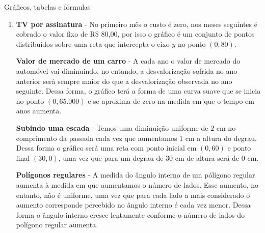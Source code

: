 \begin{answer}{Gráficos, tabelas e fórmulas}
{\begin{enumerate}


\textbf{Polígonos regulares}




\item \textbf{TV por assinatura} - No primeiro mês o custo é zero, nos meses seguintes é cobrado o valor fixo de R\$ 80,00, por isso o gráfico é um conjunto de pontos distribuídos sobre uma reta que intercepta o eixo $y$ no ponto $(0,80)$.

\textbf{Valor de mercado de um carro} - A cada ano o valor de mercado do automóvel vai diminuindo, no entando, a desvalorização sofrida no ano anterior será sempre maior do que a desvalorização observada no ano seguinte. Dessa forma, o gráfico terá a forma de uma curva suave que se inicia no ponto $(0,65.000) $ e se aproxima de zero na medida em que o tempo em anos aumenta.

\textbf{Subindo uma escada} - Temos uma diminuição uniforme de $2$ cm no comprimento da passada cada vez que aumentamos $1$ cm a altura do degrau. Dessa forma o gráfico será uma reta com ponto inicial em $(0,60)$ e ponto final $(30,0)$, uma vez que para um degrau de $30$ cm de altura será de $0$ cm.

\textbf{Polígonos regulares} - A medida do ângulo interno de um pólígono regular aumenta à medida em que aumentamos o número de lados. Esse aumento, no entanto, não é uniforme, uma vez que para cada lado a mais considerado o aumento corresponde percebido no ângulo interno é cada vez menor. Dessa forma o ângulo interno cresce lentamente conforme o número de lados do polígono regular aumenta.


\end{enumerate}}
\end{answer}
